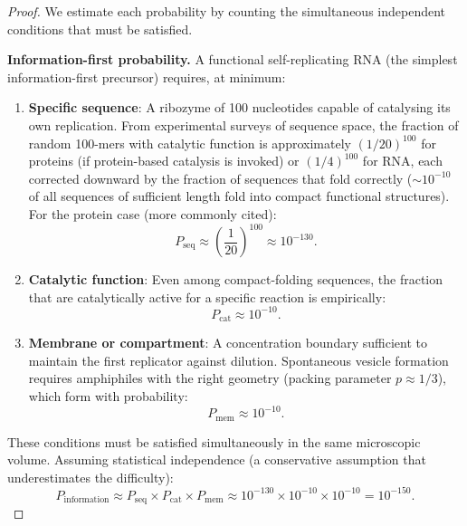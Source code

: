 \begin{proof}
We estimate each probability by counting the simultaneous independent conditions
that must be satisfied.

\medskip
\noindent\textbf{Information-first probability.}
A functional self-replicating RNA (the simplest information-first precursor)
requires, at minimum:

\begin{enumerate}[label=(\alph*)]
  \item \textbf{Specific sequence}: A ribozyme of 100 nucleotides capable of
        catalysing its own replication. From experimental surveys of sequence
        space, the fraction of random 100-mers with catalytic function is
        approximately $(1/20)^{100}$ for proteins (if protein-based catalysis
        is invoked) or $(1/4)^{100}$ for RNA, each corrected downward by the
        fraction of sequences that fold correctly ($\sim 10^{-10}$ of all
        sequences of sufficient length fold into compact functional structures).
        For the protein case (more commonly cited):
        \begin{equation}
          P_{\mathrm{seq}} \approx \left(\frac{1}{20}\right)^{100} \approx 10^{-130}.
          \label{eq:p_seq}
        \end{equation}
  \item \textbf{Catalytic function}: Even among compact-folding sequences,
        the fraction that are catalytically active for a specific reaction
        is empirically:
        \begin{equation}
          P_{\mathrm{cat}} \approx 10^{-10}.
          \label{eq:p_cat}
        \end{equation}
  \item \textbf{Membrane or compartment}: A concentration boundary sufficient
        to maintain the first replicator against dilution. Spontaneous vesicle
        formation requires amphiphiles with the right geometry (packing parameter
        $p \approx 1/3$), which form with probability:
        \begin{equation}
          P_{\mathrm{mem}} \approx 10^{-10}.
          \label{eq:p_mem}
        \end{equation}
\end{enumerate}

These conditions must be satisfied simultaneously in the same microscopic volume.
Assuming statistical independence (a conservative assumption that underestimates
the difficulty):
\begin{equation}
  P_{\mathrm{information}} \approx P_{\mathrm{seq}} \times P_{\mathrm{cat}} \times P_{\mathrm{mem}}
  \approx 10^{-130} \times 10^{-10} \times 10^{-10} = 10^{-150}.
  \label{eq:p_information}
\end{equation}


\end{proof}
